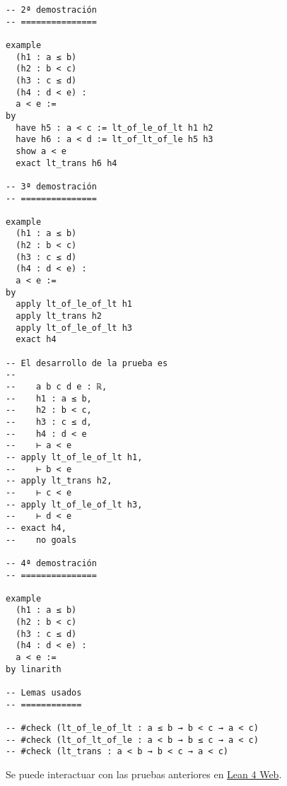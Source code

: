 \begin{verbatim}
-- 2ª demostración
-- ===============

example
  (h1 : a ≤ b)
  (h2 : b < c)
  (h3 : c ≤ d)
  (h4 : d < e) :
  a < e :=
by
  have h5 : a < c := lt_of_le_of_lt h1 h2
  have h6 : a < d := lt_of_lt_of_le h5 h3
  show a < e
  exact lt_trans h6 h4

-- 3ª demostración
-- ===============

example
  (h1 : a ≤ b)
  (h2 : b < c)
  (h3 : c ≤ d)
  (h4 : d < e) :
  a < e :=
by
  apply lt_of_le_of_lt h1
  apply lt_trans h2
  apply lt_of_le_of_lt h3
  exact h4

-- El desarrollo de la prueba es
--
--    a b c d e : ℝ,
--    h1 : a ≤ b,
--    h2 : b < c,
--    h3 : c ≤ d,
--    h4 : d < e
--    ⊢ a < e
-- apply lt_of_le_of_lt h1,
--    ⊢ b < e
-- apply lt_trans h2,
--    ⊢ c < e
-- apply lt_of_le_of_lt h3,
--    ⊢ d < e
-- exact h4,
--    no goals

-- 4ª demostración
-- ===============

example
  (h1 : a ≤ b)
  (h2 : b < c)
  (h3 : c ≤ d)
  (h4 : d < e) :
  a < e :=
by linarith

-- Lemas usados
-- ============

-- #check (lt_of_le_of_lt : a ≤ b → b < c → a < c)
-- #check (lt_of_lt_of_le : a < b → b ≤ c → a < c)
-- #check (lt_trans : a < b → b < c → a < c)
\end{verbatim}
Se puede interactuar con las pruebas anteriores en \href{https://lean.math.hhu.de/\#url=https://raw.githubusercontent.com/jaalonso/Calculemus2/main/src/Cadena\_de\_desigualdades.lean}{Lean 4 Web}.

